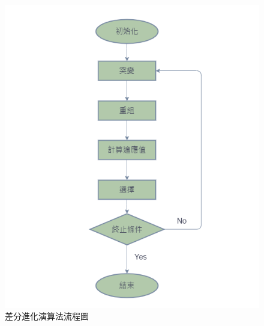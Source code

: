 \documentclass[14pt,a4paper]{report}  %
\begin{document}
      \begin{figure}[hbt!]
        \centering
        \includegraphics[scale=0.6]{DEflow.png}
        \caption{差分進化演算法流程圖}
        \label{fig_DEflow:scale}
    	\end{figure}
      
\end{document}
